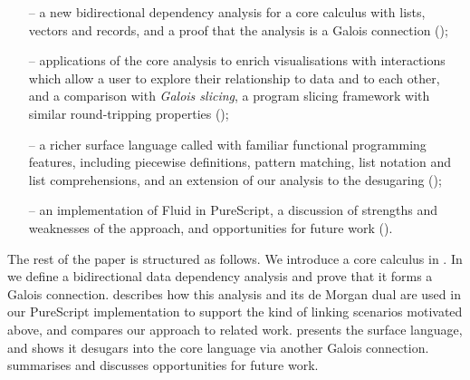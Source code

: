 \begin{itemize}
   \item[--] a new bidirectional dependency analysis for a core calculus with lists, vectors and records, and a proof that the analysis is a Galois connection ();
   \item[--] applications of the core analysis to enrich visualisations with interactions which allow a user to explore their relationship to data and to each other, and a comparison with \emph{Galois slicing}, a program slicing framework with similar round-tripping properties ();
   \item[--] a richer surface language called \OurLanguage with familiar functional programming features, including piecewise definitions, pattern matching, list notation and list comprehensions, and an extension of our analysis to the desugaring ();
   \item[--] an implementation of Fluid in PureScript, a discussion of strengths and weaknesses of the approach, and opportunities for future work ().
\end{itemize}


\noindent The rest of the paper is structured as follows. We introduce a core calculus in . In  we define a bidirectional data dependency analysis and prove that it forms a Galois connection.  describes how this analysis and its de Morgan dual are used in our PureScript implementation to support the kind of linking scenarios motivated above, and compares our approach to related work.  presents the surface language, and shows it desugars into the core language via another Galois connection.  summarises and discusses opportunities for future work.


